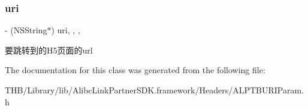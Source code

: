 \subsubsection{\texorpdfstring{uri}{uri}}
{\footnotesize\ttfamily -\/ (N\+S\+String$\ast$) uri\hspace{0.3cm}{\ttfamily [read]}, {\ttfamily [write]}, {\ttfamily [nonatomic]}, {\ttfamily [strong]}}

要跳转到的\+H5页面的url 

The documentation for this class was generated from the following file\+:\begin{DoxyCompactItemize}
\item 
T\+H\+B/\+Library/lib/\+Alibc\+Link\+Partner\+S\+D\+K.\+framework/\+Headers/A\+L\+P\+T\+B\+U\+R\+I\+Param.\+h\end{DoxyCompactItemize}
